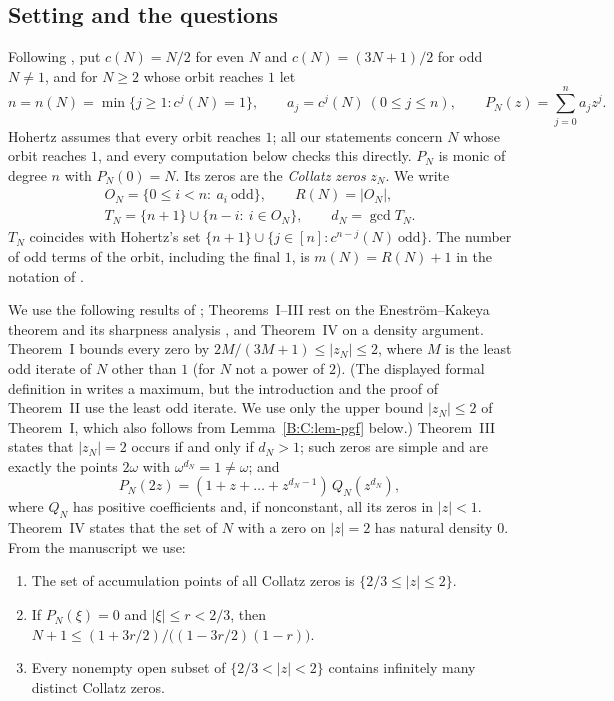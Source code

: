 \documentclass[11pt,a4paper]{article}
\theoremstyle{definition}
\theoremstyle{remark}
\numberwithin{equation}{section}
\begin{document}
\subsection{Setting and the questions}\label{B:C:ssec-setting}

Following \cite{R005}, put $c(N)=N/2$ for even $N$ and $c(N)=(3N+1)/2$ for odd
$N\ne1$, and for $N\ge2$ whose orbit reaches $1$ let
\[
n=n(N)=\min\{j\ge1:c^j(N)=1\},\qquad a_j=c^j(N)\ (0\le j\le n),\qquad
P_N(z)=\sum_{j=0}^{n}a_jz^j .
\]
Hohertz assumes that every orbit reaches $1$; all our statements concern $N$
whose orbit reaches $1$, and every computation below checks this directly.
$P_N$ is monic of degree $n$ with $P_N(0)=N$.  Its zeros are the
\emph{Collatz zeros} $z_N$.  We write
\begin{gather*}
O_N=\{0\le i<n:\ a_i\ \text{odd}\},\qquad R(N)=|O_N|,\\
T_N=\{n+1\}\cup\{n-i:\ i\in O_N\},\qquad d_N=\gcd T_N .
\end{gather*}
$T_N$ coincides with Hohertz's set $\{n+1\}\cup\{j\in[n]:c^{n-j}(N)\ \text{odd}\}$.
The number of odd terms of the orbit, including the final $1$, is
$m(N)=R(N)+1$ in the notation of \cite{R025}.

We use the following results of \cite{R005}; Theorems~I--III rest on the
Enestr\"om--Kakeya theorem and its sharpness analysis \cite{R028}, and Theorem~IV on a
density argument.  Theorem~I bounds every zero by
$2M/(3M+1)\le|z_N|\le2$, where $M$ is the least odd iterate of $N$ other than $1$
(for $N$ not a power of $2$).
(The displayed formal definition in \cite{R005} writes a maximum, but the
introduction and the proof of Theorem~II use the least odd iterate.  We use only
the upper bound $|z_N|\le2$ of Theorem~I, which also follows from
Lemma~\ref{B:C:lem-pgf} below.)  Theorem~III states that $|z_N|=2$ occurs if and only if
$d_N>1$; such zeros are simple and are exactly the points $2\omega$ with
$\omega^{d_N}=1\ne\omega$; and
\begin{equation}\label{B:C:eq-thmIII}
P_N(2z)=(1+z+\dots+z^{d_N-1})\,Q_N(z^{d_N}),
\end{equation}
where $Q_N$ has positive coefficients and, if nonconstant, all its zeros in
$|z|<1$.  Theorem~IV states that the set of $N$ with a zero on $|z|=2$ has
natural density $0$.  From the manuscript we use:

\begin{enumerate}
\item[(M1)] \cite[Thm.~3.1]{R021} The set of accumulation points of all Collatz
zeros is $\{2/3\le|z|\le2\}$.
\item[(M2)] \cite[Thm.~3.1]{R021} If $P_N(\xi)=0$ and
$|\xi|\le r<2/3$, then $N+1\le(1+3r/2)/\bigl((1-3r/2)(1-r)\bigr)$.
\item[(M3)] \cite[Section~3.2 and Cor.~3.2]{R021} Every nonempty open subset
of $\{2/3<|z|<2\}$ contains infinitely many distinct Collatz zeros.
\end{enumerate}
\end{document}
